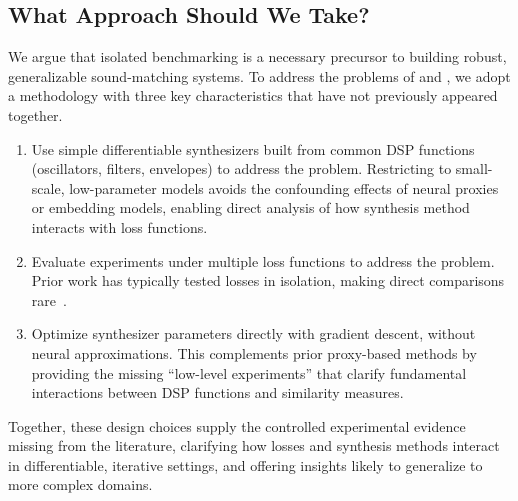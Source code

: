 \subsection{What Approach Should We Take?}
We argue that isolated benchmarking is a necessary precursor to building robust, generalizable sound-matching systems. To address the problems of \LossSelect{} and \SynthSelect{}, we adopt a methodology with three key characteristics that have not previously appeared together.

\begin{enumerate}
    \item Use simple differentiable synthesizers built from common DSP functions (oscillators, filters, envelopes) to address the \SynthSelect{} problem. Restricting to small-scale, low-parameter models avoids the confounding effects of neural proxies or embedding models, enabling direct analysis of how synthesis method interacts with loss functions. 
    \item Evaluate experiments under multiple loss functions to address the \LossSelect{} problem. Prior work has typically tested losses in isolation, making direct comparisons rare~.  
    \item Optimize synthesizer parameters directly with gradient descent, without neural approximations. This complements prior proxy-based methods by providing the missing “low-level experiments” that clarify fundamental interactions between DSP functions and similarity measures. 
\end{enumerate}

Together, these design choices supply the controlled experimental evidence missing from the literature, 
clarifying how losses and synthesis methods interact in differentiable, iterative settings, 
and offering insights likely to generalize to more complex domains.






